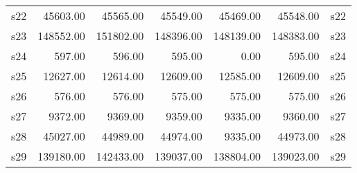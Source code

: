 \begin{table}[ht]
\begin{tabular}{rrrrrrl}
  s22 & 45603.00 & 45565.00 & 45549.00 & 45469.00 & 45548.00 & s22 \\ 
  s23 & 148552.00 & 151802.00 & 148396.00 & 148139.00 & 148383.00 & s23 \\ 
  s24 & 597.00 & 596.00 & 595.00 & 0.00 & 595.00 & s24 \\ 
  s25 & 12627.00 & 12614.00 & 12609.00 & 12585.00 & 12609.00 & s25 \\ 
  s26 & 576.00 & 576.00 & 575.00 & 575.00 & 575.00 & s26 \\ 
  s27 & 9372.00 & 9369.00 & 9359.00 & 9335.00 & 9360.00 & s27 \\ 
  s28 & 45027.00 & 44989.00 & 44974.00 & 9335.00 & 44973.00 & s28 \\ 
  s29 & 139180.00 & 142433.00 & 139037.00 & 138804.00 & 139023.00 & s29 \\ 
   \hline
\end{tabular}
\end{table}
